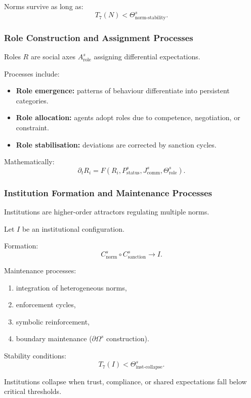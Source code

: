 Norms survive as long as:
\[
T_7(N) < \Theta^s_{\text{norm-stability}}.
\]

\subsubsection{Role Construction and Assignment Processes}

Roles $R$ are social axes $A^s_{\text{role}}$ assigning differential
expectations.

Processes include:
\begin{itemize}
    \item \textbf{Role emergence:}
    patterns of behaviour differentiate into persistent categories.
    \item \textbf{Role allocation:}
    agents adopt roles due to competence, negotiation, or constraint.
    \item \textbf{Role stabilisation:}
    deviations are corrected by sanction cycles.
\end{itemize}

Mathematically:
\[
\partial_t R_i = F(R_i, P^s_{\text{status}}, J^s_{\text{comm}}, \Theta^s_{\text{role}}).
\]

\subsubsection{Institution Formation and Maintenance Processes}

Institutions are higher-order attractors regulating multiple norms.

Let $I$ be an institutional configuration.

Formation:
\[
C^s_{\text{norm}} \circ C^s_{\text{sanction}} \to I.
\]

Maintenance processes:
\begin{enumerate}
    \item integration of heterogeneous norms,
    \item enforcement cycles,
    \item symbolic reinforcement,
    \item boundary maintenance ($\partial\Omega^s$ construction).
\end{enumerate}

Stability conditions:
\[
T_7(I) < \Theta^s_{\text{inst-collapse}}.
\]

Institutions collapse when trust, compliance, or shared expectations
fall below critical thresholds.

